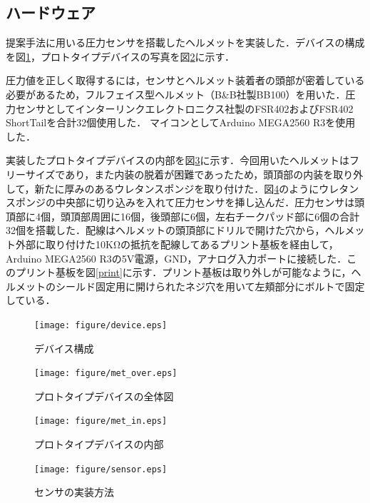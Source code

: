 \documentclass[Japanese,noauthor]{dicomopapers}
\begin{document}
\subsection{ハードウェア}
提案手法に用いる圧力センサを搭載したヘルメットを実装した．デバイスの構成を図\ref{device}，プロトタイプデバイスの写真を図\ref{met_over}に示す．

圧力値を正しく取得するには，センサとヘルメット装着者の頭部が密着している必要があるため，フルフェイス型ヘルメット（B\&B社製BB100）を用いた．圧力センサとしてインターリンクエレクトロニクス社製のFSR402およびFSR402 ShortTailを合計32個使用した．
マイコンとしてArduino MEGA2560 R3を使用した．

実装したプロトタイプデバイスの内部を図\ref{met_in}に示す．今回用いたヘルメットはフリーサイズであり，また内装の脱着が困難であったため，頭頂部の内装を取り外して，新たに厚みのあるウレタンスポンジを取り付けた．図\ref{sensor}のようにウレタンスポンジの中央部に切り込みを入れて圧力センサを挿し込んだ．圧力センサは頭頂部に4個，頭頂部周囲に16個，後頭部に6個，左右チークパッド部に6個の合計32個を搭載した．配線はヘルメットの頭頂部にドリルで開けた穴から，ヘルメット外部に取り付けた10KΩの抵抗を配線してあるプリント基板を経由して，Arduino MEGA2560 R3の5V電源，GND，アナログ入力ポートに接続した．このプリント基板を図\ref{print}に示す．プリント基板は取り外しが可能なように，ヘルメットのシールド固定用に開けられたネジ穴を用いて左頬部分にボルトで固定している．

\begin{figure}[!t]
  \begin{center}
    \texttt{[image: figure/device.eps]}
  \end{center}
  \caption{デバイス構成}
  \label{device}
\end{figure}

\begin{figure}[!t]
  \begin{center}
    \texttt{[image: figure/met\_over.eps]}
  \end{center}
  \caption{プロトタイプデバイスの全体図}
  \label{met_over}
\end{figure}

\begin{figure}[!t]
  \begin{center}
    \texttt{[image: figure/met\_in.eps]}
  \end{center}
  \caption{プロトタイプデバイスの内部}
  \label{met_in}
\end{figure}

\begin{figure}[!t]
  \begin{center}
    \texttt{[image: figure/sensor.eps]}
  \end{center}
  \caption{センサの実装方法}
  \label{sensor}
\end{figure}
\end{document}
